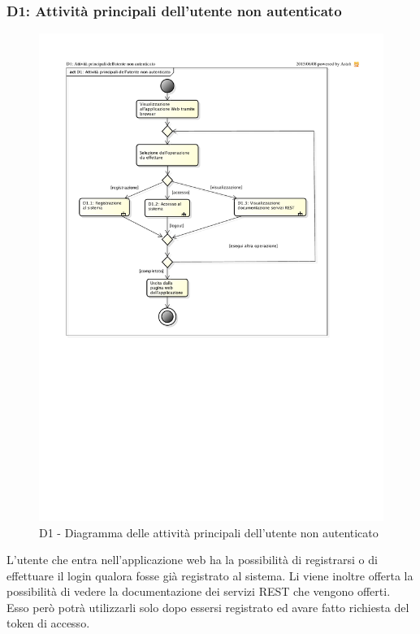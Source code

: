 		\subsubsection{D1: Attività principali dell'utente non autenticato} %
		\label{ssub:attivita_principali_dell_utente_non_autenticato}
		\begin{figure}[!htbp]
			\centering
			\centerline{\includegraphics[scale=0.67]{./images/D1.pdf}}
			\caption{D1 - Diagramma delle attività principali dell'utente non autenticato}
		\end{figure}
		\noindent
		L'utente che entra nell'applicazione web ha la possibilità di registrarsi o di effettuare il login qualora fosse già registrato al sistema. Li viene inoltre offerta la possibilità di vedere la documentazione dei servizi REST che vengono offerti. Esso però potrà utilizzarli solo dopo essersi registrato ed avare fatto richiesta del token di accesso.

